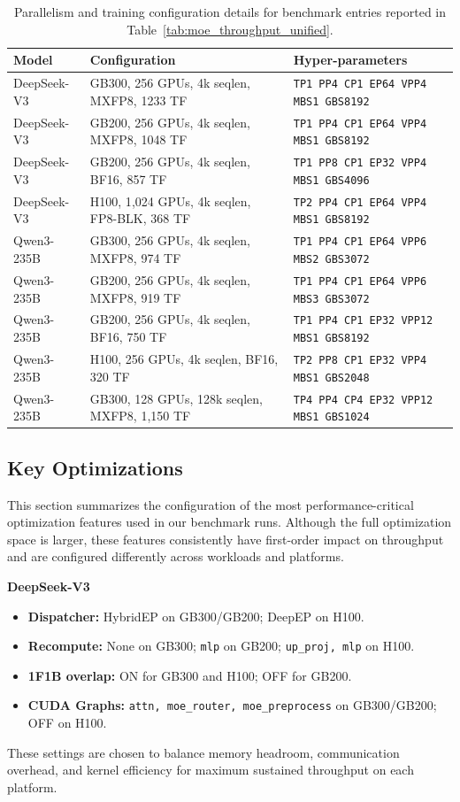 \documentclass[10pt,logo,copyright]{nvidiatechreport}
\begin{document}
\begin{table}[t]
\centering
\small
\caption{Parallelism and training configuration details for benchmark entries reported in Table~\ref{tab:moe_throughput_unified}.}
\label{tab:appendix_showcase_configs}
\begin{tabular}{lll}
\toprule
Model & Configuration & Hyper-parameters \\
\midrule
DeepSeek-V3 & GB300, 256 GPUs, 4k seqlen, MXFP8, 1233 TF      & \texttt{TP1 PP4 CP1 EP64 VPP4 MBS1 GBS8192} \\
DeepSeek-V3 & GB200, 256 GPUs, 4k seqlen, MXFP8, 1048 TF      & \texttt{TP1 PP4 CP1 EP64 VPP4 MBS1 GBS8192} \\
DeepSeek-V3 & GB200, 256 GPUs, 4k seqlen, BF16, 857 TF        & \texttt{TP1 PP8 CP1 EP32 VPP4 MBS1 GBS4096} \\
DeepSeek-V3 & H100, 1{,}024 GPUs, 4k seqlen, FP8-BLK, 368 TF  & \texttt{TP2 PP4 CP1 EP64 VPP4 MBS1 GBS8192} \\
\midrule
Qwen3-235B & GB300, 256 GPUs, 4k seqlen, MXFP8, 974 TF        & \texttt{TP1 PP4 CP1 EP64 VPP\phantom{0}6 MBS2 GBS3072} \\
Qwen3-235B & GB200, 256 GPUs, 4k seqlen, MXFP8, 919 TF        & \texttt{TP1 PP4 CP1 EP64 VPP\phantom{0}6 MBS3 GBS3072} \\
Qwen3-235B & GB200, 256 GPUs, 4k seqlen, BF16, 750 TF         & \texttt{TP1 PP4 CP1 EP32 VPP12 MBS1 GBS8192} \\
Qwen3-235B & H100, 256 GPUs, 4k seqlen, BF16, 320 TF          & \texttt{TP2 PP8 CP1 EP32 VPP\phantom{0}4 MBS1 GBS2048} \\
\midrule
Qwen3-235B & GB300, 128 GPUs, 128k seqlen, MXFP8, 1{,}150 TF    & \texttt{TP4 PP4 CP4 EP32 VPP12 MBS1 GBS1024} \\
\bottomrule
\end{tabular}
\end{table}

\subsection{Key Optimizations} 
This section summarizes the configuration of the most performance-critical optimization features used in our benchmark runs. Although the full optimization space is larger, these features consistently have first-order impact on throughput and are configured differently across workloads and platforms.

\textbf{DeepSeek-V3}
\begin{itemize}[noitemsep,topsep=0pt]
    \item \textbf{Dispatcher:} HybridEP on GB300/GB200; DeepEP on H100.
    \item \textbf{Recompute:} None on GB300; \texttt{mlp} on GB200; \texttt{up\_proj, mlp} on H100.
    \item \textbf{1F1B overlap:} ON for GB300 and H100; OFF for GB200.
    \item \textbf{CUDA Graphs:} \texttt{attn, moe\_router, moe\_preprocess} on GB300/GB200; OFF on H100.
\end{itemize}
These settings are chosen to balance memory headroom, communication overhead, and kernel efficiency for maximum sustained throughput on each platform.
\end{document}
